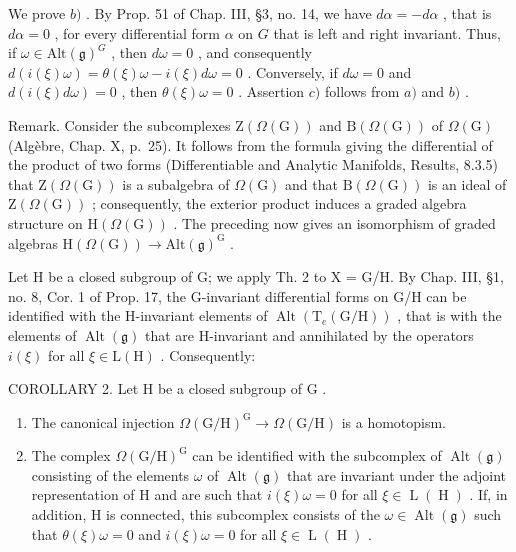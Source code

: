 We prove \(b)\) . By Prop. 51 of Chap. III, §3, no. 14, we have \(d\alpha = -d\alpha\) , that is \(d\alpha = 0\) , for every differential form \(\alpha\) on \(G\) that is left and right invariant. Thus, if \(\omega \in \mathrm{Alt}(\mathfrak{g})^G\) , then \(d\omega = 0\) , and consequently \(d(i(\xi)\omega) = \theta(\xi)\omega - i(\xi)d\omega = 0\) . Conversely, if \(d\omega = 0\) and \(d(i(\xi)d\omega) = 0\) , then \(\theta(\xi)\omega = 0\) . Assertion \(c)\) follows from \(a)\) and \(b)\) .

Remark. Consider the subcomplexes \(\mathrm{Z}(\varOmega(\mathrm{G}))\) and \(\mathrm{B}(\varOmega(\mathrm{G}))\) of \(\varOmega(\mathrm{G})\) (Algèbre, Chap. X, p.~25). It follows from the formula giving the differential of the product of two forms (Differentiable and Analytic Manifolds, Results, 8.3.5) that \(\mathrm{Z}(\varOmega(\mathrm{G}))\) is a subalgebra of \(\varOmega(\mathrm{G})\) and that \(\mathrm{B}(\varOmega(\mathrm{G}))\) is an ideal of \(\mathrm{Z}(\varOmega(\mathrm{G}))\) ; consequently, the exterior product induces a graded algebra structure on \(\mathrm{H}(\varOmega(\mathrm{G}))\) . The preceding now gives an isomorphism of graded algebras \(\mathrm{H}(\varOmega(\mathrm{G})) \to \mathrm{Alt}(\mathfrak{g})^{\mathrm{G}}\) .

Let H be a closed subgroup of G; we apply Th. 2 to X = G/H. By Chap. III, §1, no. 8, Cor. 1 of Prop. 17, the G-invariant differential forms on G/H can be identified with the H-invariant elements of \(\operatorname{Alt}(\mathrm{T}_{e}(\mathrm{G}/\mathrm{H}))\) , that is with the elements of \(\operatorname{Alt}(\mathfrak{g})\) that are H-invariant and annihilated by the operators \(i(\xi)\) for all \(\xi \in \mathrm{L}(\mathrm{H})\) . Consequently:

COROLLARY 2. Let \(\mathrm{H}\) be a closed subgroup of \(\mathrm{G}\) .

\begin{enumerate}
\def\labelenumi{\alph{enumi})}
\item
  The canonical injection \(\Omega (\mathrm{G / H})^{\mathrm{G}}\to \Omega (\mathrm{G / H})\) is a homotopism.
\item
  The complex \(\Omega(\mathrm{G}/\mathrm{H})^{\mathrm{G}}\) can be identified with the subcomplex of \(\operatorname{Alt}(\mathfrak{g})\) consisting of the elements \(\omega\) of \(\operatorname{Alt}(\mathfrak{g})\) that are invariant under the adjoint representation of H and are such that \(i(\xi)\omega = 0\) for all \(\xi \in \operatorname{L}(\operatorname{H})\) . If, in addition, H is connected, this subcomplex consists of the \(\omega \in \operatorname{Alt}(\mathfrak{g})\) such that \(\theta(\xi)\omega = 0\) and \(i(\xi)\omega = 0\) for all \(\xi \in \operatorname{L}(\operatorname{H})\) .
\end{enumerate}

